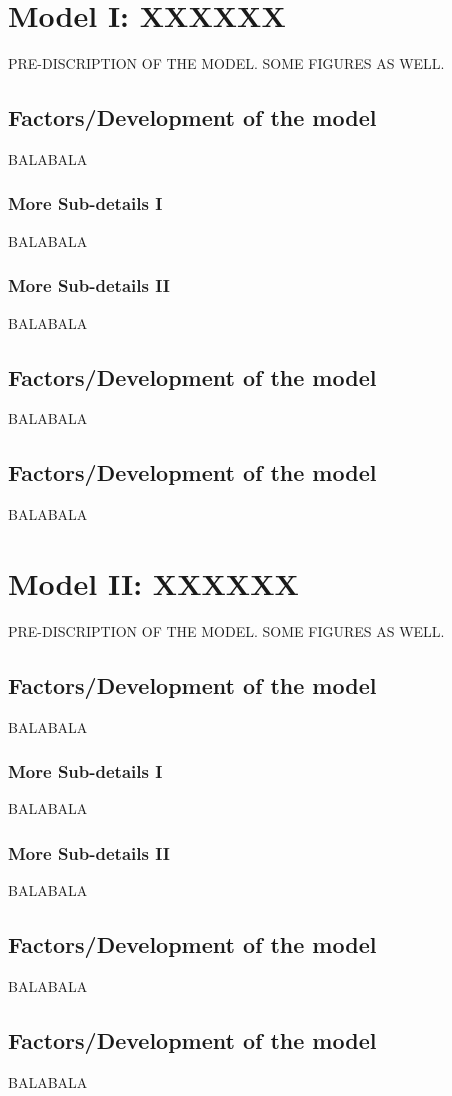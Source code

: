 \documentclass{mcmthesis}
\begin{document}
\section{Model I: XXXXXX}
PRE-DISCRIPTION OF THE MODEL. SOME FIGURES AS WELL.
\subsection{Factors/Development of the model}
BALABALA
\subsubsection{More Sub-details I}
BALABALA
\subsubsection{More Sub-details II}
BALABALA
\subsection{Factors/Development of the model}
BALABALA
\subsection{Factors/Development of the model}
BALABALA


\section{Model II: XXXXXX}
PRE-DISCRIPTION OF THE MODEL. SOME FIGURES AS WELL.
\subsection{Factors/Development of the model}
BALABALA
\subsubsection{More Sub-details I}
BALABALA
\subsubsection{More Sub-details II}
BALABALA
\subsection{Factors/Development of the model}
BALABALA
\subsection{Factors/Development of the model}
BALABALA
\end{document}
